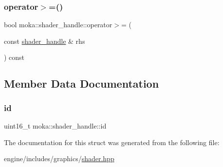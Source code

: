 \mbox{\label{structmoka_1_1shader__handle_ab61e1c889ebff6662c1b79c7c4d19be5}} 
\subsubsection{\texorpdfstring{operator$>$=()}{operator>=()}}
{\footnotesize\ttfamily bool moka\+::shader\+\_\+handle\+::operator$>$= (\begin{DoxyParamCaption}\item[{const \mbox{\hyperlink{structmoka_1_1shader__handle}{shader\+\_\+handle}} \&}]{rhs }\end{DoxyParamCaption}) const\hspace{0.3cm}{\ttfamily [inline]}}



\subsection{Member Data Documentation}
\mbox{\label{structmoka_1_1shader__handle_a0bfa42b516494512cdb1b84e47d1c98e}} 
\subsubsection{\texorpdfstring{id}{id}}
{\footnotesize\ttfamily uint16\+\_\+t moka\+::shader\+\_\+handle\+::id}



The documentation for this struct was generated from the following file\+:\begin{DoxyCompactItemize}
\item 
engine/includes/graphics/\mbox{\hyperlink{shader_8hpp}{shader.\+hpp}}\end{DoxyCompactItemize}
